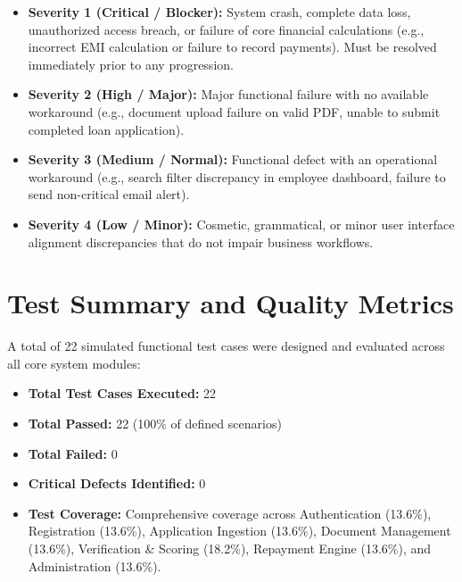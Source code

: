 \begin{itemize}
  \item \textbf{Severity 1 (Critical / Blocker):} System crash, complete data loss, unauthorized access breach, or failure of core financial calculations (e.g., incorrect EMI calculation or failure to record payments). Must be resolved immediately prior to any progression.
  \item \textbf{Severity 2 (High / Major):} Major functional failure with no available workaround (e.g., document upload failure on valid PDF, unable to submit completed loan application).
  \item \textbf{Severity 3 (Medium / Normal):} Functional defect with an operational workaround (e.g., search filter discrepancy in employee dashboard, failure to send non-critical email alert).
  \item \textbf{Severity 4 (Low / Minor):} Cosmetic, grammatical, or minor user interface alignment discrepancies that do not impair business workflows.
\end{itemize}

\section{Test Summary and Quality Metrics}

A total of 22 simulated functional test cases were designed and evaluated across all core system modules:

\begin{itemize}
  \item \textbf{Total Test Cases Executed:} 22
  \item \textbf{Total Passed:} 22 (100\% of defined scenarios)
  \item \textbf{Total Failed:} 0
  \item \textbf{Critical Defects Identified:} 0
  \item \textbf{Test Coverage:} Comprehensive coverage across Authentication (13.6\%), Registration (13.6\%), Application Ingestion (13.6\%), Document Management (13.6\%), Verification \& Scoring (18.2\%), Repayment Engine (13.6\%), and Administration (13.6\%).
\end{itemize}
